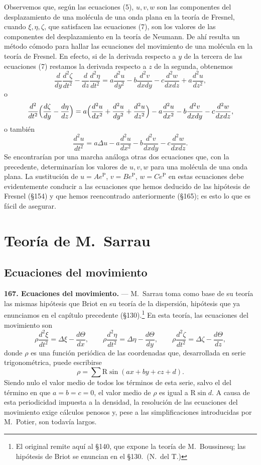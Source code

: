Observemos que, según las ecuaciones (5), $u,v,w$ son las componentes del
desplazamiento de una molécula de una onda plana en la teoría de Fresnel,
cuando $\xi,\eta,\zeta$, que satisfacen las ecuaciones (7), son los
valores de las componentes del desplazamiento en la teoría de Neumann. De
ahí resulta un método cómodo para hallar las ecuaciones del movimiento de
una molécula en la teoría de Fresnel. En efecto, si de la derivada respecto
a $y$ de la tercera de las ecuaciones (7) restamos la derivada respecto a
$z$ de la segunda, obtenemos
\[
\frac{d}{dy}\frac{d^2\zeta}{dt^2}-\frac{d}{dz}\frac{d^2\eta}{dt^2}
=a\frac{d^2u}{dy^2}-b\frac{d^2v}{dxdy}-c\frac{d^2w}{dxdz}+a\frac{d^2u}{dz^2},
\]
o
\[
\frac{d^2}{dt^2}\Bigl(\frac{d\zeta}{dy}-\frac{d\eta}{dz}\Bigr)
=a\Bigl(\frac{d^2u}{dx^2}+\frac{d^2u}{dy^2}+\frac{d^2u}{dz^2}\Bigr)
-a\frac{d^2u}{dx^2}-b\frac{d^2v}{dxdy}-c\frac{d^2w}{dxdz},
\]
o también
\[
\frac{d^2u}{dt^2}=a\Delta u-a\frac{d^2u}{dx^2}-b\frac{d^2v}{dxdy}-c\frac{d^2w}{dxdz}.
\]
Se encontrarían por una marcha análoga otras dos ecuaciones que, con la
precedente, determinarían los valores de $u,v,w$ para una molécula de una
onda plana. La sustitución de $u=Ae^{\mathrm P}$, $v=Be^{\mathrm P}$,
$w=Ce^{\mathrm P}$ en estas ecuaciones debe evidentemente conducir a las
ecuaciones que hemos deducido de las hipótesis de Fresnel (§154) y que
hemos reencontrado anteriormente (§165); es esto lo que es fácil de
asegurar.

\section{Teoría de M.~Sarrau}

\subsection{Ecuaciones del movimiento}

\noindent\textbf{167. Ecuaciones del movimiento.} — M.~Sarrau toma como
base de su teoría las mismas hipótesis que Briot en su teoría de la
dispersión, hipótesis que ya enunciamos en el capítulo precedente
(§130).\footnote{El original remite aquí al §140, que expone la teoría de
M.~Boussinesq; las hipótesis de Briot se enuncian en el §130.~(N.~del T.)}
En esta teoría, las ecuaciones del movimiento son
\begin{equation}
\rho\frac{d^2\xi}{dt^2}=\Delta\xi-\frac{d\Theta}{dx},\qquad
\rho\frac{d^2\eta}{dt^2}=\Delta\eta-\frac{d\Theta}{dy},\qquad
\rho\frac{d^2\zeta}{dt^2}=\Delta\zeta-\frac{d\Theta}{dz},
\tag{1}
\end{equation}
donde $\rho$ es una función periódica de las coordenadas que, desarrollada
en serie trigonométrica, puede escribirse
\[
\rho=\sum \mathrm R\sin(ax+by+cz+d).
\]
Siendo nulo el valor medio de todos los términos de esta serie, salvo el
del término en que $a=b=c=0$, el valor medio de $\rho$ es igual a $\mathrm
R\sin d$. A causa de esta periodicidad impuesta a la densidad, la
resolución de las ecuaciones del movimiento exige cálculos penosos y,
pese a las simplificaciones introducidas por M.~Potier, son todavía
largos.

